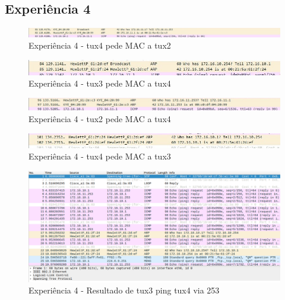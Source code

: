\subsection{Experiência 4}

\begin{figure}[H]
\centering
  \includegraphics[width=\linewidth]{img/exp4-tux2-ask-tux4.jpg}
  \caption{Experiência 4 - tux4 pede MAC a tux2}
\end{figure}

\begin{figure}[H]
\centering
  \includegraphics[width=\linewidth]{img/exp4-tux3-ask-tux4.jpg}
  \caption{Experiência 4 - tux3 pede MAC a tux4}
\end{figure}

\begin{figure}[H]
\centering
  \includegraphics[width=\linewidth]{img/exp4-tux4-ask-tux2.jpg}
  \caption{Experiência 4 - tux2 pede MAC a tux4}
\end{figure}

\begin{figure}[H]
\centering
  \includegraphics[width=\linewidth]{img/exp4-tux4-ask-tux3.jpg}
  \caption{Experiência 4 - tux4 pede MAC a tux3}
\end{figure}

\begin{figure}[H]
\centering
  \includegraphics[width=\linewidth]{img/EXP4-3to4-253.png}
  \caption{Experiência 4 - Resultado de tux3 ping tux4 via 253}
\end{figure}


